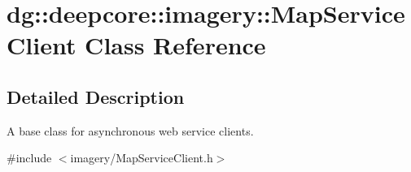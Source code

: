 \hypertarget{classdg_1_1deepcore_1_1imagery_1_1_map_service_client}{}\section{dg\+:\+:deepcore\+:\+:imagery\+:\+:Map\+Service\+Client Class Reference}
\label{classdg_1_1deepcore_1_1imagery_1_1_map_service_client}


\subsection{Detailed Description}
A base class for asynchronous web service clients. 

{\ttfamily \#include $<$imagery/\+Map\+Service\+Client.\+h$>$}

